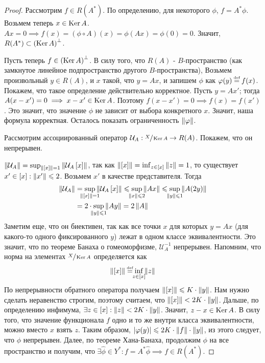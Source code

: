 \begin{proof}
	Рассмотрим $f \in R(A^*)$. По определению, для некоторого $\phi$, $f = A^*\phi$.
	Возьмем теперь $x \in \operatorname{Ker} A$. $Ax = 0 \implies f(x) = (\phi \circ A)(x) = \phi(Ax) = \phi(0) = 0$.
	Значит, $R(A^*) \subset \left( \operatorname{Ker} A\right)^\bot$.
	
	Пусть теперь $f \in \left( \operatorname{Ker} A\right)^\bot$. В силу того, что $R(A)$ - $B$-пространство
	(как замкнутое линейное подпространство другого $B$-пространства),
	Возьмем произвольный $y \in R(A)$, и $x$ такой, что $y = Ax$,
	и запишем $\phi$ как $\phi(y) \defeq f(x)$. Покажем, что такое определение
	действительно корректное.
	Пусть $y = Ax'$; тогда $A(x - x') = 0 \implies x - x' \in \operatorname{Ker} A$.
	Поэтому $f(x - x') = 0 \implies f(x) = f(x')$. Это значит, что значение $\phi$ не
	зависит от выбора конкретного $x$. Значит, наша формула корректная.
	Осталось показать ограниченность $\left\|\varphi\right\|$.

	Рассмотрим ассоциированный оператор
	$\mathcal{U}_A : \sfrac{X}{\operatorname{Ker} A} \rightarrow R(A)$.
	Покажем, что он непрерывен.

	$\left\|\mathcal{U}_A\right\| = \sup_{\left\|\left[x \right]\right\| = 1} \left\|\mathcal{U}_A\left[x \right]\right\|$,
	так как $\left\|\left[x \right]\right\| = \inf_{z \in \left[x \right]} \left\|z\right\| = 1$,
	то существует $x' \in \left[x \right] : \left\|x'\right\| \leqslant 2$.
	Возьмем $x'$ в качестве представителя. Тогда
	\begin{equation}
		\begin{split}
			\norm{\mathcal{U}_A} & =
            \sup_{\mathclap{\norm{\eqcls{x}} = 1}} \norm{\mathcal{U}_A\eqcls{x}}
            \leqslant \sup_{\mathclap{\norm{x} \leqslant 2}} \norm{Ax}
            \leqslant \sup_{\mathclap{\norm{y} \leqslant 1}} \norm{A(2y)} \\
            & = 2 \cdot \sup_{\mathclap{\norm{y} \leqslant 1}} \norm{Ay}
			= 2 \norm{A}
		\end{split}
	\end{equation}
	Заметим еще, что он биективен, так как все точки $x$ для которых $y = Ax$
	(для какого-то одного фиксированного $y$) лежат в одном классе эквивалентности.
    Это значит, что по теореме Банаха о гомеоморфизме, $\mathcal{U}_A^{-1}$ непрерывен.
    Напомним, что норма на элементах $\sfrac{X}{\operatorname{Ker} A}$ определяется как
	\begin{gather}
        \norm{\eqcls{x}} \defeq \inf_{\mathclap{z \in \eqcls{x}}} \norm{z}
	\end{gather}
	По непрерывности обратного оператора получаем $\left\|\left[x \right]\right\| \leqslant K \cdot \left\|y\right\|$.
	Нам нужно сделать неравенство строгим, поэтому считаем, что
	$\left\|\left[x \right]\right\| < 2K \cdot \left\|y\right\|$. Дальше, по определению инфимума,
	$\exists z \in \left[x \right] : \left\|z\right\| < 2K \cdot \left\|y\right\|$. Значит, $z - x \in \operatorname{Ker} A$.
	В силу того, что значение функционала $f$ одно и то же внутри класса эквивалентности,
	можно вместо $x$ взять $z$. Таким образом,
	$\left|\varphi(y)\right| \leqslant 2K \cdot \left\|f\right\| \cdot \left\|y\right\|$, из этого следует, что
	$\phi$ непрерывен.
	Далее, по теореме Хана-Банаха, продолжим $\phi$ на все пространство и получим, что
	$\exists \widehat{\phi} \in Y^* : f = A^*\widehat{\phi} \implies f \in R(A^*)$.
\end{proof}

